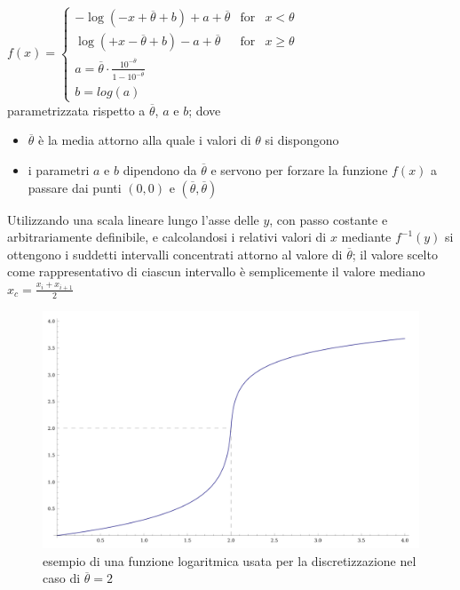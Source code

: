 $f(x) =	\left\{ \begin{array}{rcl}  
	-\log(-x+\overline{\theta}+b) + a + \overline{\theta} & \mbox{for} & x<\theta \\ 
	\log(+x-\overline{\theta}+b) - a + \overline{\theta} & \mbox{for} & x\geq\theta \\ 
	a = \overline{\theta}\cdot \frac{10^{-\overline{\theta}}}{1 - 10^{-\overline{\theta}}} & & \\ 
	b = log(a) \end{array} 
 \right.$ 	\\

parametrizzata rispetto a $\overline{\theta}$, $a$ e $b$; dove 
\begin{itemize}
\item $\overline{\theta}$ \`e la media attorno alla quale i valori di $\theta$ si dispongono
\item i parametri $a$ e $b$ dipendono da $\overline{\theta}$ e servono per forzare la funzione $f(x)$ a passare dai punti $(0,0)$ e $(\overline{\theta},\overline{\theta})$
\end{itemize}

Utilizzando una scala lineare lungo l'asse delle $y$, con passo costante e arbitrariamente definibile, e calcolandosi i relativi valori di $x$ mediante $f^{-1}(y)$ si ottengono i suddetti intervalli concentrati attorno al valore di $\overline{\theta}$; il valore scelto come rappresentativo di ciascun intervallo \`e semplicemente il valore mediano $x_{c} = \frac{x_{i} + x_{i + 1}}{2}$ \\

\begin{figure}[!h]{
	\begin{center}
	   \includegraphics[width=\textwidth]{figures/loga-ritmo-per-ballare.png}
	\end{center}}
	\caption{esempio di una funzione logaritmica usata per la discretizzazione nel caso di $\overline{\theta} = 2$}
	\label{fig:log}
\end{figure}


